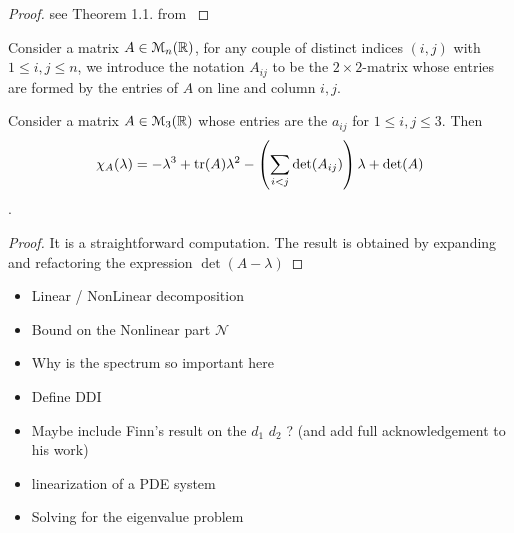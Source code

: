 \begin{proof}
	see Theorem 1.1. from \cite{Arendt1984}
\end{proof}


%
%


\begin{definition}
	Consider a matrix $A \in \EuScript{M}_n(\mathbb{R})$, for any couple of distinct indices $(i, j)$ with $1 \le i, j \le n$, we introduce the notation $A_{ij}$ to be the $2 \! \times \! 2$-matrix whose entries are formed by the entries of $A$ on line and column $i, j$.
\end{definition}


\begin{proposition} Consider a matrix $A \in \EuScript{M}_3(\mathbb{R})$ whose entries are the $a_{ij}$ for $1 \le i, j \le 3$. Then 
	$$\chi_A(\lambda) = -\lambda^3 + \mathrm{tr}(A) \lambda^2 - \left( \sum_{i < j} \mathrm{det}(A_{ij})\right) \lambda + \mathrm{det}(A)$$.
\end{proposition}

\begin{proof}
	It is a straightforward computation. The result is obtained by expanding and refactoring the expression $\det(A - \lambda)$
\end{proof}

\begin{itemize}
    \item Linear / NonLinear decomposition
    \item Bound on the Nonlinear part $\mathcal N$
    
    \item Why is the spectrum so important here
    \item Define DDI
    \item Maybe include Finn's result on the $d_1$ $d_2$ ? (and add full acknowledgement to his work)
    \item linearization of a PDE system
    \item Solving for the eigenvalue problem   
\end{itemize}